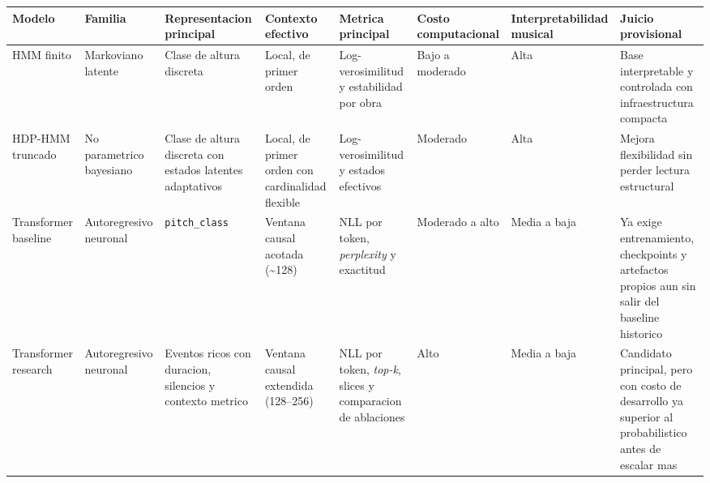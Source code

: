 \begin{tabular}{p{3.1cm}p{2.0cm}p{2.7cm}p{2.0cm}p{1.9cm}p{2.0cm}p{2.2cm}p{2.4cm}}
\hline
Modelo & Familia & Representacion principal & Contexto efectivo & Metrica principal & Costo computacional & Interpretabilidad musical & Juicio provisional \\
\hline
HMM finito & Markoviano latente & Clase de altura discreta & Local, de primer orden & Log-verosimilitud y estabilidad por obra & Bajo a moderado & Alta & Base interpretable y controlada con infraestructura compacta \\
HDP-HMM truncado & No parametrico bayesiano & Clase de altura discreta con estados latentes adaptativos & Local, de primer orden con cardinalidad flexible & Log-verosimilitud y estados efectivos & Moderado & Alta & Mejora flexibilidad sin perder lectura estructural \\
Transformer baseline & Autoregresivo neuronal & \texttt{pitch\_class} & Ventana causal acotada (\textasciitilde 128) & NLL por token, \emph{perplexity} y exactitud & Moderado a alto & Media a baja & Ya exige entrenamiento, checkpoints y artefactos propios aun sin salir del baseline historico \\
Transformer research & Autoregresivo neuronal & Eventos ricos con duracion, silencios y contexto metrico & Ventana causal extendida (128--256) & NLL por token, \emph{top-k}, slices y comparacion de ablaciones & Alto & Media a baja & Candidato principal, pero con costo de desarrollo ya superior al probabilistico antes de escalar mas \\
\hline
\end{tabular}
